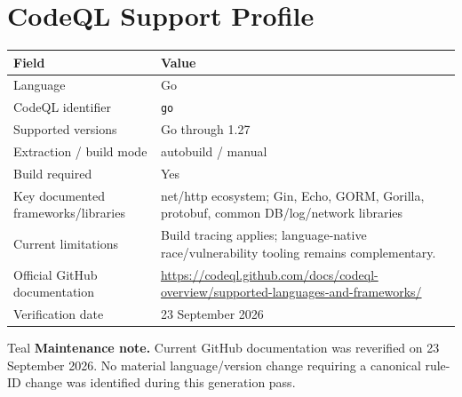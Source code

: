 \documentclass[10pt,letterpaper]{article}
\newcommand{\code}[1]{\texttt{\small #1}}
\begin{document}
\section{CodeQL Support Profile}
\begin{tabularx}{\textwidth}{@{}P{1.9in}Y@{}}
\toprule
\textbf{Field} & \textbf{Value}\\
\midrule
Language & Go\\
CodeQL identifier & \code{go}\\
Supported versions & Go through 1.27\\
Extraction / build mode & autobuild / manual\\
Build required & Yes\\
Key documented frameworks/libraries & net/http ecosystem; Gin, Echo, GORM, Gorilla, protobuf, common DB/log/network libraries\\
Current limitations & Build tracing applies; language-native race/vulnerability tooling remains complementary.\\
Official GitHub documentation & \url{https://codeql.github.com/docs/codeql-overview/supported-languages-and-frameworks/}\\
Verification date & 23 September 2026\\
\bottomrule
\end{tabularx}
\begin{callout}{Teal}
\textbf{Maintenance note.} Current GitHub documentation was reverified on 23 September 2026. No material language/version change requiring a canonical rule-ID change was identified during this generation pass.
\end{callout}
\end{document}

